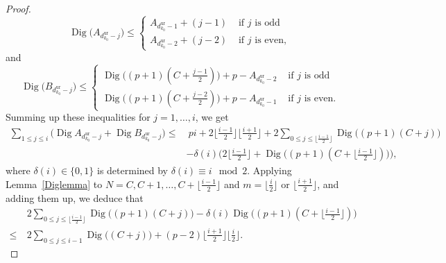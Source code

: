 \begin{proof}
    \begin{equation*}
    \nonumber
    {\operatorname{Dig}}\big(A_{d_{k_0}^{\mathrm{ur}}- j}\big) \leq
    \begin{cases}
    A_{d_{k_0}^{\mathrm{ur}}-1}+ (j-1) &  \textrm{ if } j \textrm{ is odd}
    \\
    A_{d_{k_0}^{\mathrm{ur}}-2}+ (j-2) & \textrm{ if } j \textrm{ is even},
    \end{cases}
    \end{equation*}
    and
    \begin{equation*}
    \label{Eq1}
    {\operatorname{Dig}}\big(B_{d_{k_0}^{\mathrm{ur}}- j}\big) \leq
    \begin{cases}
    {\operatorname{Dig}}\big((p+1)(C+\frac{j-1}{2})\big)+p- A_{d_{k_0}^{\mathrm{ur}}-2}&  \textrm{ if } j \textrm{ is odd}
    \\
    {\operatorname{Dig}}\big((p+1)(C+\frac{j-2}{2})\big)+p- A_{d_{k_0}^{\mathrm{ur}}-1}& \textrm{ if } j  \textrm{ is even}.
    \end{cases}
    \end{equation*}
    Summing up these inequalities for $j=1,\dots, i$, we get
    \begin{align}
    \label{E:diga_plus_digb}
    \displaystyle \sum_{1 \leq j \leq i}{\big( {\operatorname{Dig}}A_{d_{k_0}^{\mathrm{ur}}- j} +{\operatorname{Dig}}B_{d_{k_0}^{\mathrm{ur}}-j}}\big) \leq &\ pi + 2\lfloor\tfrac{i-1}{2}\rfloor\lfloor\tfrac{i+1}{2}\rfloor+ 2\displaystyle \sum_{0 \leq j \leq \lfloor\frac{i-1}{2}\rfloor}{{\operatorname{Dig}}\big((p+1)(C+j)\big)}\\
    \nonumber
    &- \delta(i)\big(2\lfloor\tfrac{i-1}{2}\rfloor+{\operatorname{Dig}}\big((p+1)(C+\lfloor\tfrac{i-1}{2}\rfloor)\big)\big),
    \end{align}
    where $\delta(i)\in\{0,1\}$ is determined by $\delta(i)\equiv i\mod 2$.
    Applying Lemma~\ref{Diglemma} to $N=C,C+1,\dots,C +\lfloor\frac{i-1}{2}\rfloor$ and $m=\lfloor\frac{i}{2}\rfloor$ or $\lfloor\frac{i+1}{2}\rfloor$, and adding them up, we deduce
    that
    \begin{align*}
    &2 \sum_{0 \leq j \leq \lfloor\frac{i-1}{2}\rfloor}{{\operatorname{Dig}}\big((p+1)(C+j)\big)}-\delta(i){\operatorname{Dig}}\big((p+1)(C+\lfloor\tfrac{i-1}{2}\rfloor)\big) \\
    \leq\ &
    2\displaystyle \sum_{0 \leq j \leq i-1}{{\operatorname{Dig}}\big((C+j)\big)}+(p-2)\lfloor\tfrac{i+1}{2}\rfloor\lfloor\tfrac{i}{2}\rfloor.
    \end{align*}

\end{proof}
